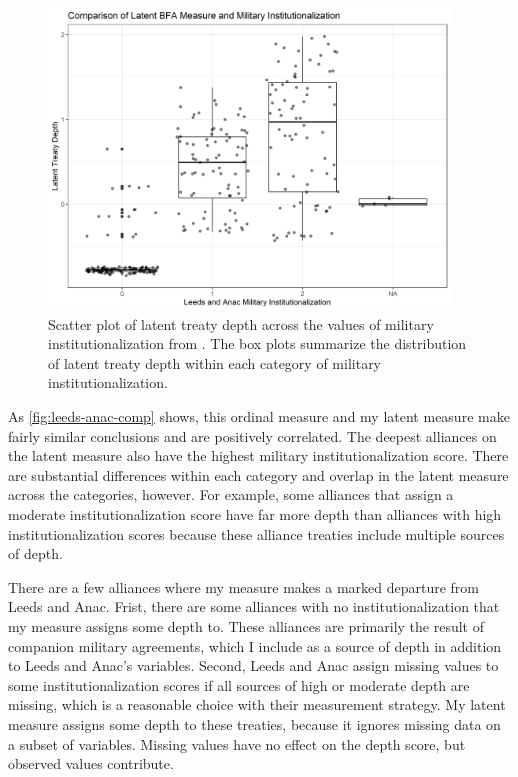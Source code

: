 \documentclass[12pt]{article}
\begin{document}
\begin{figure}[htbp]
	\centering
		\includegraphics[width=0.95\textwidth]{leeds-anac-comp.png}
	\caption{Scatter plot of latent treaty depth across the values of military institutionalization from \citet{LeedsAnac2005}. The box plots summarize the distribution of latent treaty depth within each category of military institutionalization.}
	\label{fig:leeds-anac-comp}
\end{figure}


As \autoref{fig:leeds-anac-comp} shows, this ordinal measure and my latent measure make fairly similar conclusions and are positively correlated. 
The deepest alliances on the latent measure also have the highest military institutionalization score. 
There are substantial differences within each category and overlap in the latent measure across the categories, however. 
For example, some alliances that \citet{LeedsAnac2005} assign a moderate institutionalization score have far more depth than alliances with high institutionalization scores because these alliance treaties include multiple sources of depth. 


There are a few alliances where my measure makes a marked departure from Leeds and Anac. 
Frist, there are some alliances with no institutionalization that my measure assigns some depth to. 
These alliances are primarily the result of companion military agreements, which I include as a source of depth in addition to Leeds and Anac's variables. 
Second, Leeds and Anac assign missing values to some institutionalization scores if all sources of high or moderate depth are missing, which is a reasonable choice with their measurement strategy.
My latent measure assigns some depth to these treaties, because it ignores missing data on a subset of variables. 
Missing values have no effect on the depth score, but observed values contribute. 
\end{document}
